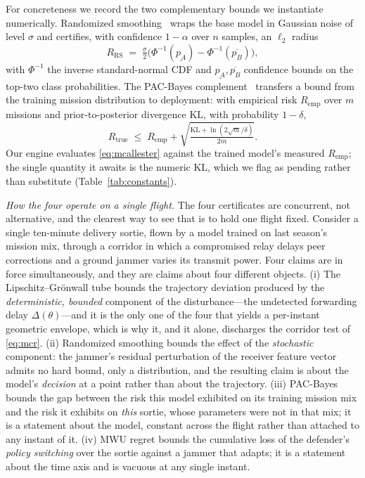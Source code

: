 For concreteness we record the two complementary bounds we instantiate
numerically. Randomized smoothing~\cite{cohen2019smoothing} wraps the base model
in Gaussian noise of level $\sigma$ and certifies, with confidence $1-\alpha$
over $n$ samples, an $\ell_2$ radius
\begin{equation}
\label{eq:cohen}
R_{\mathrm{RS}} \;=\; \tfrac{\sigma}{2}\big(\Phi^{-1}(\underline{p_A})-\Phi^{-1}(\overline{p_B})\big),
\end{equation}
with $\Phi^{-1}$ the inverse standard-normal CDF and
$\underline{p_A},\overline{p_B}$ confidence bounds on the top-two class
probabilities. The PAC-Bayes
complement~\cite{mcallester1999pac,viallard2021pacbayes} transfers a bound from
the training mission distribution to deployment: with empirical risk
$R_{\mathrm{emp}}$ over $m$ missions and prior-to-posterior divergence
$\mathrm{KL}$, with probability $1-\delta$,
\begin{equation}
\label{eq:mcallester}
R_{\mathrm{true}} \;\le\; R_{\mathrm{emp}} + \sqrt{\tfrac{\mathrm{KL}+\ln(2\sqrt{m}/\delta)}{2m}}.
\end{equation}
Our engine evaluates \eqref{eq:mcallester} against the trained model's measured
$R_{\mathrm{emp}}$; the single quantity it awaits is the numeric $\mathrm{KL}$,
which we flag as pending rather than substitute (Table~\ref{tab:constants}).

\emph{How the four operate on a single flight.} The four certificates are
concurrent, not alternative, and the clearest way to see that is to hold one
flight fixed. Consider a single ten-minute delivery sortie, flown by a model
trained on last season's mission mix, through a corridor in which a compromised
relay delays peer corrections and a ground jammer varies its transmit power.
Four claims are in force simultaneously, and they are claims about four
different objects. (i) The Lipschitz--Gr\"onwall tube bounds the trajectory
deviation produced by the \emph{deterministic, bounded} component of the
disturbance---the undetected forwarding delay $\Delta(\theta)$---and it is the
only one of the four that yields a per-instant geometric envelope, which is why
it, and it alone, discharges the corridor test of \eqref{eq:mcr}. (ii)
Randomized smoothing bounds the effect of the \emph{stochastic} component: the
jammer's residual perturbation of the receiver feature vector admits no hard
bound, only a distribution, and the resulting claim is about the model's
\emph{decision} at a point rather than about the trajectory. (iii) PAC-Bayes
bounds the gap between the risk this model exhibited on its training mission mix
and the risk it exhibits on \emph{this} sortie, whose parameters were not in
that mix; it is a statement about the model, constant across the flight rather
than attached to any instant of it. (iv) MWU regret bounds the cumulative loss
of the defender's \emph{policy switching} over the sortie against a jammer that
adapts; it is a statement about the time axis and is vacuous at any single
instant.


